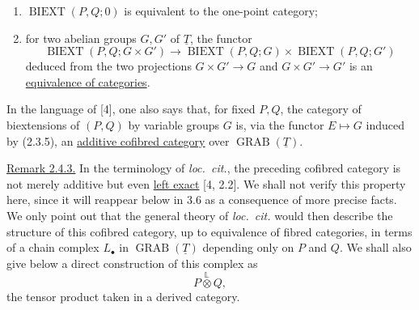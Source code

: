 \begin{enumerate}[label=\alph*)]
\item $\operatorname{BIEXT}(P,Q;0)$ is equivalent to the one-point
category;
\item for two abelian groups $G,G'$ of $\underline T$, the functor
\begin{equation}\tag{2.4.2}
 \operatorname{BIEXT}(P,Q;G\times G')
 \longrightarrow
 \operatorname{BIEXT}(P,Q;G)\times
 \operatorname{BIEXT}(P,Q;G')
\end{equation}
deduced from the two projections $G\times G'\longrightarrow G$ and
$G\times G'\longrightarrow G'$ is an
\underline{equivalence of categories}.
\end{enumerate}
In the language of [4], one also says that, for fixed $P,Q$, the
category of biextensions of $(P,Q)$ by variable groups $G$ is, via the
functor $E\mapsto G$ induced by (2.3.5), an
\underline{additive cofibred category} over
$\operatorname{GRAB}(\underline T)$.

\underline{Remark 2.4.3.} In the terminology of \emph{loc.\ cit.}, the
preceding cofibred category is not merely additive but even
\underline{left exact} [4, 2.2]. We shall not verify this property here,
since it will reappear below in 3.6 as a consequence of more precise
facts. We only point out that the general theory of \emph{loc.\ cit.}
would then describe the structure of this cofibred category, up to
equivalence of fibred categories, in terms of a chain complex
$L_\bullet$ in $\operatorname{GRAB}(\underline T)$ depending only on
$P$ and $Q$. We shall also give below a direct construction of this
complex as
\[
 P\overset{\mathbb L}{\otimes}Q,
\]
the tensor product taken in a derived category.

